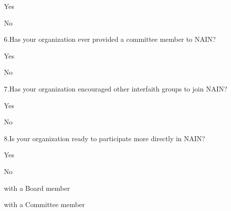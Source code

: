 \documentclass{article}
\begin{document}
\addtocounter{sub_item}{1}   
  
Yes
 \immediate{} 
\addtocounter{sub_item}{1}   
  
No
 \immediate{} 
 
  
%
%
 \setcounter{sub_item}{0}
\immediate{} 
  
6.Has your organization ever provided a committee member to NAIN?
 
\addtocounter{sub_item}{1}   
  
Yes
 \immediate{} 
\addtocounter{sub_item}{1}   
  
No
 \immediate{} 
 
  
%
%
 \setcounter{sub_item}{0}
\immediate{} 
  
7.Has your organization encouraged other interfaith groups to join NAIN? 
 
\addtocounter{sub_item}{1}   
  
Yes
 \immediate{} 
\addtocounter{sub_item}{1}   
  
No
 \immediate{} 
 
  
%
%
 \setcounter{sub_item}{0}
\immediate{} 
  
8.Is your organization ready to participate more directly in NAIN?
 
\addtocounter{sub_item}{1}   
  
Yes
 \immediate{} 
\addtocounter{sub_item}{1}   
  
No
 \immediate{} 
\addtocounter{sub_item}{1}   
  
with a Board member
 \immediate{} 
\addtocounter{sub_item}{1}   
  
with a Committee member
 \immediate{} 
\addtocounter{sub_item}{1}   
  
\end{document}
